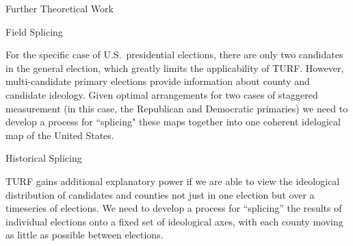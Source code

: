 \documentclass{article}
\begin{document}
\begin{section}{Further Theoretical Work}
\begin{subsection}{Field Splicing}

For the specific case of U.S.\ presidential elections, there are only two candidates in the general election, which greatly limits the applicability of TURF. However, multi-candidate primary elections provide information about county and candidate ideology. Given optimal arrangements for two cases of staggered measurement (in this case, the Republican and Democratic primaries) we need to develop a process for ``splicing" these maps together into one coherent idelogical map of the United States.

\end{subsection}

\begin{subsection}{Historical Splicing}

TURF gains additional explanatory power if we are able to view the ideological distribution of candidates and counties not just in one election but over a timeseries of elections. We need to develop a process for ``splicing'' the results of individual elections onto a fixed set of ideological axes, with each county moving as little as possible between elections.

\end{subsection}

\end{section}
\end{document}
